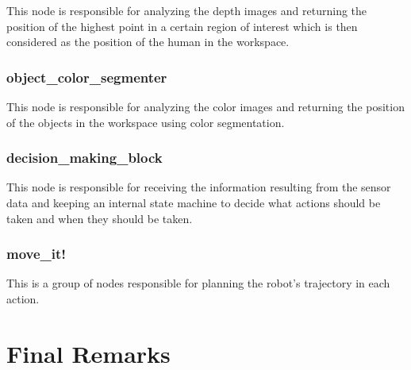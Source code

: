 This node is responsible for analyzing the depth images and returning the position of the highest point in a certain region of interest which is then considered as the position of the human in the workspace.

\subsubsection{object\_color\_segmenter}

This node is responsible for analyzing the color images and returning the position of the objects in the workspace using color segmentation.

\subsubsection{decision\_making\_block}

This node is responsible for receiving the information resulting from the sensor data and keeping an internal state machine to decide what actions should be taken and when they should be taken.

\subsubsection{move\_it!}

This is a group of nodes responsible for planning the robot's trajectory in each action.
\fi

\section{Final Remarks}